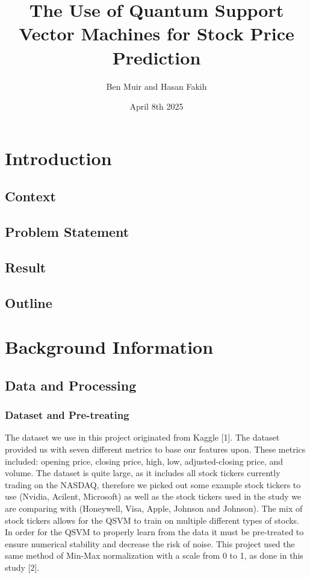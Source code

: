 \documentclass{article}
\title{The Use of Quantum Support Vector Machines for Stock Price Prediction}
\author{Ben Muir and Hasan Fakih}
\date{April 8th 2025}
\begin{document}
\maketitle

\section*{Introduction}
\subsection*{Context}
\subsection*{Problem Statement}
\subsection*{Result}
\subsection*{Outline}
\section*{Background Information}

\subsection*{Data and Processing}
\subsubsection*{Dataset and Pre-treating}
The dataset we use in this project originated from Kaggle [1]. The dataset provided us with seven different metrics to base our features upon. These metrics included: opening price, closing price, high, low, adjusted-closing price, and volume. The dataset is quite large, as it includes all stock tickers currently trading on the NASDAQ, therefore we picked out some example stock tickers to use (Nvidia, Acilent, Microsoft) as well as the stock tickers used in the study we are comparing with (Honeywell, Visa, Apple, Johnson and Johnson). The mix of stock tickers allows for the QSVM to train on multiple different types of stocks. In order for the QSVM to properly learn from the data it must be pre-treated to ensure numerical stability and decrease the risk of noise. This project used the same method of Min-Max normalization with a scale from 0 to 1, as done in this study [2]. 
\end{document}
